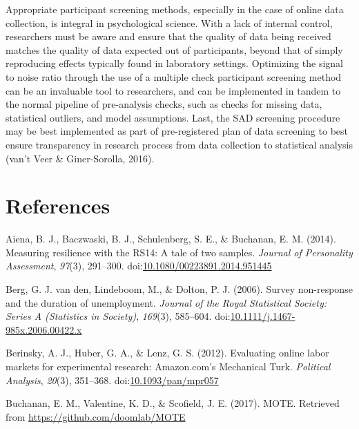\documentclass[english,man]{apa6}
\theoremstyle{definition}
\theoremstyle{definition}
\theoremstyle{definition}
\theoremstyle{remark}
\begin{document}
Appropriate participant screening methods, especially in the case of
online data collection, is integral in psychological science. With a
lack of internal control, researchers must be aware and ensure that the
quality of data being received matches the quality of data expected out
of participants, beyond that of simply reproducing effects typically
found in laboratory settings. Optimizing the signal to noise ratio
through the use of a multiple check participant screening method can be
an invaluable tool to researchers, and can be implemented in tandem to
the normal pipeline of pre-analysis checks, such as checks for missing
data, statistical outliers, and model assumptions. Last, the SAD
screening procedure may be best implemented as part of pre-registered
plan of data screening to best ensure transparency in research process
from data collection to statistical analysis (van't Veer \&
Giner-Sorolla, 2016).

\newpage

\section{References}\label{references}

\setlength{\parindent}{-0.5in} \setlength{\leftskip}{0.5in}

\hypertarget{refs}{}
\hypertarget{ref-Aiena2014}{}
Aiena, B. J., Baczwaski, B. J., Schulenberg, S. E., \& Buchanan, E. M.
(2014). Measuring resilience with the RS14: A tale of two samples.
\emph{Journal of Personality Assessment}, \emph{97}(3), 291--300.
doi:\href{https://doi.org/10.1080/00223891.2014.951445}{10.1080/00223891.2014.951445}

\hypertarget{ref-Berg2006}{}
Berg, G. J. van den, Lindeboom, M., \& Dolton, P. J. (2006). Survey
non-response and the duration of unemployment. \emph{Journal of the
Royal Statistical Society: Series A (Statistics in Society)},
\emph{169}(3), 585--604.
doi:\href{https://doi.org/10.1111/j.1467-985x.2006.00422.x}{10.1111/j.1467-985x.2006.00422.x}

\hypertarget{ref-Berinsky2012}{}
Berinsky, A. J., Huber, G. A., \& Lenz, G. S. (2012). Evaluating online
labor markets for experimental research: Amazon.com's Mechanical Turk.
\emph{Political Analysis}, \emph{20}(3), 351--368.
doi:\href{https://doi.org/10.1093/pan/mpr057}{10.1093/pan/mpr057}

\hypertarget{ref-Buchanan2017}{}
Buchanan, E. M., Valentine, K. D., \& Scofield, J. E. (2017). MOTE.
Retrieved from \url{https://github.com/doomlab/MOTE}
\end{document}
